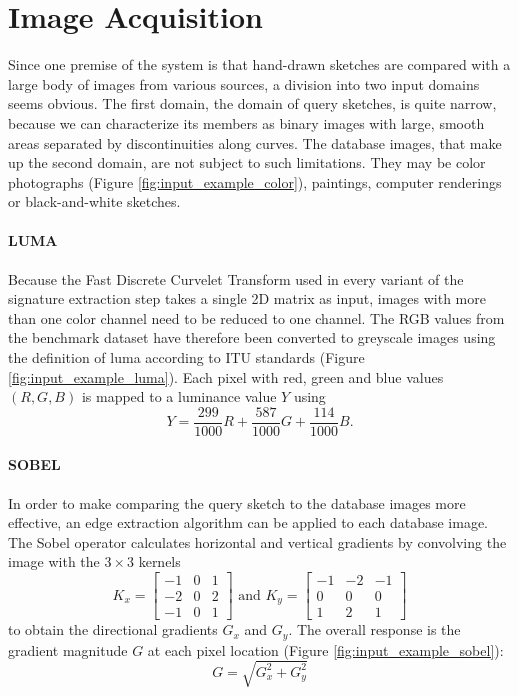 \section{Image Acquisition}

Since one premise of the system is that hand-drawn sketches are compared with a
large body of images from various sources, a division into two input domains
seems obvious. The first domain, the domain of query sketches, is quite narrow,
because we can characterize its members as binary images with large, smooth
areas separated by discontinuities along curves. The database images, that make
up the second domain, are not subject to such limitations. They may be color
photographs (Figure \ref{fig:input_example_color}), paintings, computer
renderings or black-and-white sketches.

\paragraph{LUMA}

Because the Fast Discrete Curvelet Transform used in every variant of the
signature extraction step takes a single 2D matrix as input, images with more
than one color channel need to be reduced to one channel. The RGB values from
the benchmark dataset have therefore been converted to greyscale images using
the definition of luma according to ITU standards \autocite{_parameter_2002}
(Figure \ref{fig:input_example_luma}).  Each pixel with red, green and blue
values $(R, G, B)$ is mapped to a luminance value $Y$ using
\begin{equation*}
    Y = \frac{299}{1000}R + \frac{587}{1000}G + \frac{114}{1000}B.
\end{equation*}

\paragraph{SOBEL}

In order to make comparing the query sketch to the database images more
effective, an edge extraction algorithm can be applied to each database image.
The Sobel operator calculates horizontal and vertical gradients by convolving
the image with the $3 \times 3$ kernels
\begin{equation*}
    K_x =
    \begin{bmatrix}
        -1 & 0 & 1 \\
        -2 & 0 & 2 \\
        -1 & 0 & 1
    \end{bmatrix}
    \text{ and }
    K_y =
    \begin{bmatrix}
        -1 & -2 & -1 \\
         0 &  0 &  0 \\
         1 &  2 &  1
    \end{bmatrix}
\end{equation*}
to obtain the directional gradients $G_x$ and $G_y$. The overall response is
the gradient magnitude $G$ at each pixel location (Figure
\ref{fig:input_example_sobel}):
\begin{equation*}
    G = \sqrt{G_x^2 + G_y^2}
\end{equation*}

